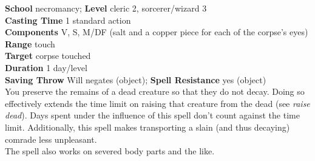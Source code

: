 \textbf{School} necromancy; \textbf{Level} cleric 2, sorcerer/wizard 3\\
\textbf{Casting Time} 1 standard action\\
\textbf{Components} V, S, M/DF (salt and a copper piece for each of the corpse's eyes)\\
\textbf{Range} touch\\
\textbf{Target} corpse touched\\
\textbf{Duration} 1 day/level\\
\textbf{Saving Throw }Will negates (object); \textbf{Spell Resistance} yes (object)\\
You preserve the remains of a dead creature so that they do not decay. Doing so effectively extends the time limit on raising that creature from the dead (see \textit{raise dead}). Days spent under the influence of this spell don't count against the time limit. Additionally, this spell makes transporting a slain (and thus decaying) comrade less unpleasant.\\
The spell also works on severed body parts and the like.\\
